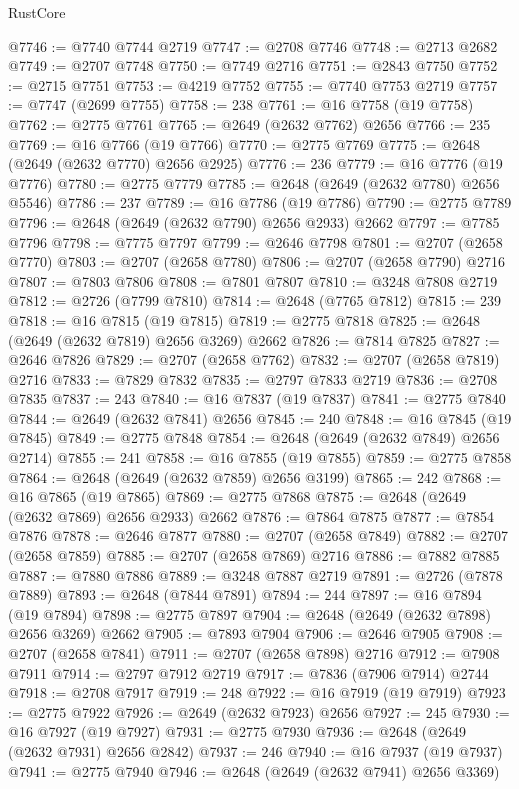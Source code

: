 \begin{lexlean}{RustCore}
\begin{coremodule}
@7746 := @7740 @7744 @2719
@7747 := @2708 @7746
@7748 := @2713 @2682
@7749 := @2707 @7748
@7750 := @7749 @2716
@7751 := @2843 @7750
@7752 := @2715 @7751
@7753 := @4219 @7752
@7755 := @7740 @7753 @2719
@7757 := @7747 (@2699 @7755)
@7758 := 238
@7761 := @16 @7758 (@19 @7758)
@7762 := @2775 @7761
@7765 := @2649 (@2632 @7762) @2656
@7766 := 235
@7769 := @16 @7766 (@19 @7766)
@7770 := @2775 @7769
@7775 := @2648 (@2649 (@2632 @7770) @2656 @2925)
@7776 := 236
@7779 := @16 @7776 (@19 @7776)
@7780 := @2775 @7779
@7785 := @2648 (@2649 (@2632 @7780) @2656 @5546)
@7786 := 237
@7789 := @16 @7786 (@19 @7786)
@7790 := @2775 @7789
@7796 := @2648 (@2649 (@2632 @7790) @2656 @2933) @2662
@7797 := @7785 @7796
@7798 := @7775 @7797
@7799 := @2646 @7798
@7801 := @2707 (@2658 @7770)
@7803 := @2707 (@2658 @7780)
@7806 := @2707 (@2658 @7790) @2716
@7807 := @7803 @7806
@7808 := @7801 @7807
@7810 := @3248 @7808 @2719
@7812 := @2726 (@7799 @7810)
@7814 := @2648 (@7765 @7812)
@7815 := 239
@7818 := @16 @7815 (@19 @7815)
@7819 := @2775 @7818
@7825 := @2648 (@2649 (@2632 @7819) @2656 @3269) @2662
@7826 := @7814 @7825
@7827 := @2646 @7826
@7829 := @2707 (@2658 @7762)
@7832 := @2707 (@2658 @7819) @2716
@7833 := @7829 @7832
@7835 := @2797 @7833 @2719
@7836 := @2708 @7835
@7837 := 243
@7840 := @16 @7837 (@19 @7837)
@7841 := @2775 @7840
@7844 := @2649 (@2632 @7841) @2656
@7845 := 240
@7848 := @16 @7845 (@19 @7845)
@7849 := @2775 @7848
@7854 := @2648 (@2649 (@2632 @7849) @2656 @2714)
@7855 := 241
@7858 := @16 @7855 (@19 @7855)
@7859 := @2775 @7858
@7864 := @2648 (@2649 (@2632 @7859) @2656 @3199)
@7865 := 242
@7868 := @16 @7865 (@19 @7865)
@7869 := @2775 @7868
@7875 := @2648 (@2649 (@2632 @7869) @2656 @2933) @2662
@7876 := @7864 @7875
@7877 := @7854 @7876
@7878 := @2646 @7877
@7880 := @2707 (@2658 @7849)
@7882 := @2707 (@2658 @7859)
@7885 := @2707 (@2658 @7869) @2716
@7886 := @7882 @7885
@7887 := @7880 @7886
@7889 := @3248 @7887 @2719
@7891 := @2726 (@7878 @7889)
@7893 := @2648 (@7844 @7891)
@7894 := 244
@7897 := @16 @7894 (@19 @7894)
@7898 := @2775 @7897
@7904 := @2648 (@2649 (@2632 @7898) @2656 @3269) @2662
@7905 := @7893 @7904
@7906 := @2646 @7905
@7908 := @2707 (@2658 @7841)
@7911 := @2707 (@2658 @7898) @2716
@7912 := @7908 @7911
@7914 := @2797 @7912 @2719
@7917 := @7836 (@7906 @7914) @2744
@7918 := @2708 @7917
@7919 := 248
@7922 := @16 @7919 (@19 @7919)
@7923 := @2775 @7922
@7926 := @2649 (@2632 @7923) @2656
@7927 := 245
@7930 := @16 @7927 (@19 @7927)
@7931 := @2775 @7930
@7936 := @2648 (@2649 (@2632 @7931) @2656 @2842)
@7937 := 246
@7940 := @16 @7937 (@19 @7937)
@7941 := @2775 @7940
@7946 := @2648 (@2649 (@2632 @7941) @2656 @3369)

\end{coremodule}
\end{lexlean}
